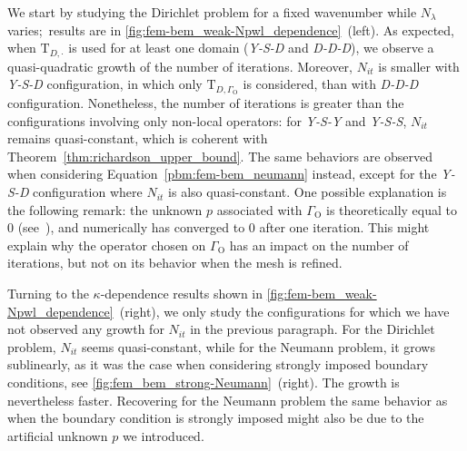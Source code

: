 \documentclass[a4paper,11pt]{article}
\newcommand{\mT}{\mathrm{T}}
\newcommand{\SchurYukawa}{\textit{Y-S}}
\newcommand{\DespresDespresDespres}{\textit{D-D-D}}
\newcommand{\YukawaSchurDespres}{\textit{Y-S-D}}
\newcommand{\YukawaSchurSchur}{\textit{Y-S-S}}
\newcommand{\YukawaSchurYukawa}{\textit{Y-S-Y}}
\newcommand{\figpart}[2]{\cref{#1}~(#2)}
\begin{document}
We start by studying the Dirichlet problem for a fixed wavenumber while \(N_{\lambda}\) varies;~results are in \figpart{fig:fem-bem_weak-Npwl_dependence}{left}. As expected, when \(\mT_{D,\cdot}\) is used for at least one domain (\YukawaSchurDespres{} and \DespresDespresDespres), we observe a quasi-quadratic growth of the number of iterations. Moreover, \(N_{it}\) is smaller with \YukawaSchurDespres{} configuration, in which only \(\mT_{D,\Gamma_{\text{O}}}\) is considered, than with \DespresDespresDespres{} configuration.
Nonetheless, the number of iterations is greater than the configurations involving only non-local operators: for \YukawaSchurYukawa{} and \YukawaSchurSchur{}, \(N_{it}\) remains quasi-constant, which is coherent with Theorem~\ref{thm:richardson_upper_bound}.
The same behaviors are observed when considering Equation~\eqref{pbm:fem-bem_neumann} instead, except for the \YukawaSchurDespres{} configuration where \(N_{it}\) is also quasi-constant.
One possible explanation is the following remark: the unknown \(p\) associated with \(\Gamma_{\text{O}}\) is theoretically equal to \(0\) (see~\cite[Example~3.2]{MR4665035}), and numerically has converged to \(0\) after one iteration. This might explain why the operator chosen on \(\Gamma_{\text{O}}\) has an impact on the number of iterations, but not on its behavior when the mesh is refined.

Turning to the \(\kappa\)-dependence results shown in \figpart{fig:fem-bem_weak-Npwl_dependence}{right}, we only study the configurations for which we have not observed any growth for \(N_{it}\) in the previous paragraph. For the Dirichlet problem, \(N_{it}\) seems quasi-constant, while for the Neumann problem, it grows sublinearly, as it was the case when considering strongly imposed boundary conditions, see \figpart{fig:fem_bem_strong-Neumann}{right}. The growth is nevertheless faster. Recovering for the Neumann problem the same behavior as when the boundary condition is strongly imposed might also be due to the artificial unknown \(p\) we introduced.

\end{document}
